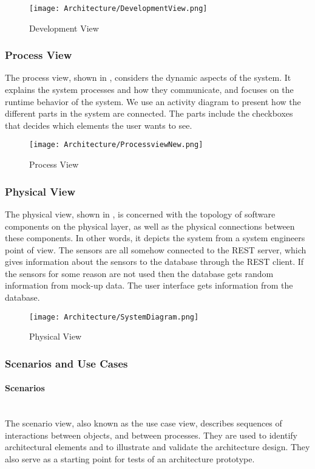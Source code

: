 \documentclass[../document.tex]{subfiles}
\begin{document}
\begin{figure}[H]
	\centering
	\texttt{[image: Architecture/DevelopmentView.png]}
	\caption{Development View}
	\label{fig:DevelopmentView}
\end{figure}

\subsubsection{Process View}
The process view, shown in , considers the dynamic aspects of the system. It explains the system processes and how they communicate, and focuses on the runtime behavior of the system. We use an activity diagram to present how the different parts in the system are connected. The parts include the checkboxes that decides which elements the user wants to see. 

\begin{figure}[H]
	\centering
	\texttt{[image: Architecture/ProcessviewNew.png]}
	\caption{Process View}
	\label{fig:ProcessView}
\end{figure}

\subsubsection{Physical View}
The physical view, shown in , is concerned with the topology of software components on the physical layer, as well as the physical connections between these components. In other words, it depicts the system from a system engineers point of view. The sensors are all somehow connected to the REST server, which gives information about the sensors to the database through the REST client. If the sensors for some reason are not used then the database gets random information from mock-up data. The user interface gets information from the database.

\begin{figure}[H]
	\centering
	\texttt{[image: Architecture/SystemDiagram.png]}
	\caption{Physical View}
	\label{fig:SystemDiagram}
\end{figure}

\subsubsection{Scenarios and Use Cases}
\paragraph{Scenarios} \ \\
The scenario view, also known as the use case view, describes sequences of interactions between objects, and between processes. They are used to identify architectural elements and to illustrate and validate the architecture design. They also serve as a starting point for tests of an architecture prototype.
\end{document}
